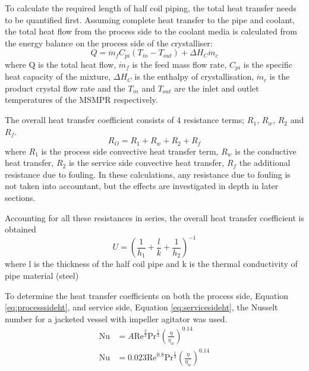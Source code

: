 To calculate the required length of half coil piping, the total heat transfer needs to be quantified first. Assuming complete heat transfer to the pipe and coolant, the total heat flow from the process side to the coolant media is calculated from the energy balance on the process side of the crystalliser:
\begin{equation} \label{eq:energy balance}
    Q =  \Dot{m}_{f}C_{pi}(T_{in}-T_{out})+ \Delta H_{C}\Dot{m}_{c}
\end{equation}
where Q is the total heat flow, $\Dot{m}_f$ is the feed mass flow rate, $C_{pi}$ is the specific heat capacity of the mixture, $\Delta H_{C}$ is the enthalpy of crystallisation, $\Dot{m}_{c}$ is the product crystal flow rate and the $T_{in}$ and $T_{out}$ are the inlet and outlet temperatures of the MSMPR respectively.


The overall heat transfer coefficient consists of 4 resistance terms; $R_1$, $R_w$, $R_2$ and $R_f$.
\begin{equation} \label{eq:resistht}
    R_O = R_1 + R_w + R_2 + R_f
\end{equation}
where $R_1$ is the process side convective heat transfer term, $R_w$ is the conductive heat transfer, $R_2$ is the service side convective heat transfer, $R_f$ the additional resistance due to fouling. In these calculations, any resistance due to fouling is not taken into accountant, but the effects are investigated in depth in later sections. %

Accounting for all these resistances in series, the overall heat transfer coefficient is obtained  
\begin{equation} \label{eq:energy balance}
    U = \left(\frac{1}{h_1} + \frac{l}{k}   + \frac{1}{h_2 } \right)^{-1}
\end{equation}
where l is the thickness of the half coil pipe and k is the thermal conductivity of pipe material (steel)

To determine the heat transfer coefficients on both the process side, Equation \ref{eq:processsideht}, and service side, Equation \ref{eq:servicesideht}, the Nusselt number for a jacketed vessel with impeller agitator %
was used. 
\begin{align} 
    \mathrm{Nu} &= A\mathrm{Re}^{\frac{2}{3}}\mathrm{Pr}^{\frac{1}{3}}\left( \frac{\eta}{\eta_w} \right)^{0.14} \label{eq:processsideht} \\
    \mathrm{Nu} &= 0.023\mathrm{Re}^{0.8}\mathrm{Pr}^{\frac{1}{3}} \left( \frac{\eta}{\eta_w} \right)^{0.14} \label{eq:servicesideht}
\end{align}

